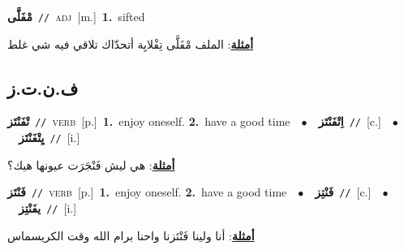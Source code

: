 \documentclass[10pt,a4paper,twoside]{article} %
\begin{document}
\begin{multicols}{2}
{\setlength\topsep{0pt}\textbf{\foreignlanguage{arabic}{مْفَلَّى}}\ {\color{gray}\texttt{//}\color{black}}\ \textsc{adj}\ [m.]\ \textbf{1.}~sifted\  \begin{flushright}\color{gray}\foreignlanguage{arabic}{\textbf{\underline{\foreignlanguage{arabic}{أمثلة}}}: الملف مْفَلَّى تِفْلايِة أتحدّاك تلاقي فيه شي غلط}\end{flushright}\color{black}} \vspace{2mm}

\vspace{-3mm}
\subsection*{\color{blue}\foreignlanguage{arabic}{ف.ن.ت.ز}\color{blue}{}} 

{\setlength\topsep{0pt}\textbf{\foreignlanguage{arabic}{تْفَنْتَز}}\ {\color{gray}\texttt{//}\color{black}}\ \textsc{verb}\ [p.]\ \textbf{1.}~enjoy oneself.  \textbf{2.}~have a good time\ \ $\bullet$\ \ \setlength\topsep{0pt}\textbf{\foreignlanguage{arabic}{اِتْفَنْتَز}}\ {\color{gray}\texttt{//}\color{black}}\ [c.]\ \ $\bullet$\ \ \setlength\topsep{0pt}\textbf{\foreignlanguage{arabic}{يِتْفَنْتَز}}\ {\color{gray}\texttt{//}\color{black}}\ [i.]\  \begin{flushright}\color{gray}\foreignlanguage{arabic}{\textbf{\underline{\foreignlanguage{arabic}{أمثلة}}}: هي ليش فَنْجَرَت عيونها هيك؟}\end{flushright}\color{black}} \vspace{2mm}

{\setlength\topsep{0pt}\textbf{\foreignlanguage{arabic}{فَنْتَز}}\ {\color{gray}\texttt{//}\color{black}}\ \textsc{verb}\ [p.]\ \textbf{1.}~enjoy oneself.  \textbf{2.}~have a good time\ \ $\bullet$\ \ \setlength\topsep{0pt}\textbf{\foreignlanguage{arabic}{فَنْتِز}}\ {\color{gray}\texttt{//}\color{black}}\ [c.]\ \ $\bullet$\ \ \setlength\topsep{0pt}\textbf{\foreignlanguage{arabic}{يفَنْتِز}}\ {\color{gray}\texttt{//}\color{black}}\ [i.]\  \begin{flushright}\color{gray}\foreignlanguage{arabic}{\textbf{\underline{\foreignlanguage{arabic}{أمثلة}}}: أنا ولينا فَنْتَزنا واحنا برام الله وقت الكريسماس}\end{flushright}\color{black}} \vspace{2mm}


\end{multicols}
\end{document}
